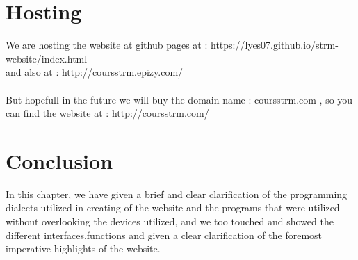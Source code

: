 \section{Hosting}
We are hosting the website at github pages at : https://lyes07.github.io/strm-website/index.html\\
and also at : http://coursstrm.epizy.com/
\\\\But hopefull in the future we will buy the domain name : coursstrm.com , so you can find the website at : http://coursstrm.com/
\section{Conclusion}
In this chapter, we have given a brief and clear clarification of the programming dialects utilized in creating of the website and the programs that were utilized without overlooking the devices utilized, and we too touched and showed the different interfaces,functions and given a clear clarification of the foremost imperative highlights of the website.\\